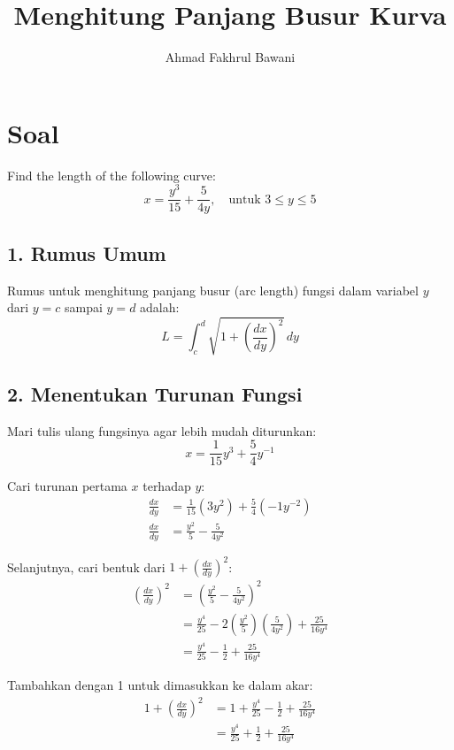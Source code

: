 \documentclass[12pt,a4paper]{article}
\title{Menghitung Panjang Busur Kurva}
\author{Ahmad Fakhrul Bawani}
\date{}
\begin{document}
\maketitle

\section*{Soal}

Find the length of the following curve:
\begin{equation*}
  x = \frac{y^3}{15} + \frac{5}{4y}, \quad \text{untuk } 3 \le y \le 5
\end{equation*}

\subsection*{1. Rumus Umum}
Rumus untuk menghitung panjang busur (arc length) fungsi dalam variabel $y$ dari $y = c$ sampai $y = d$ adalah:
\begin{equation*}
  L = \int_{c}^{d} \sqrt{1 + \left(\frac{dx}{dy}\right)^2} \, dy
\end{equation*}

\subsection*{2. Menentukan Turunan Fungsi}
Mari tulis ulang fungsinya agar lebih mudah diturunkan:
\begin{equation*}
  x = \frac{1}{15}y^3 + \frac{5}{4}y^{-1}
\end{equation*}

Cari turunan pertama $x$ terhadap $y$:
\begin{align*}
  \frac{dx}{dy} &= \frac{1}{15}(3y^2) + \frac{5}{4}(-1y^{-2}) \\
  \frac{dx}{dy} &= \frac{y^2}{5} - \frac{5}{4y^2}
\end{align*}

Selanjutnya, cari bentuk dari $1 + \left(\frac{dx}{dy}\right)^2$:
\begin{align*}
  \left(\frac{dx}{dy}\right)^2 &= \left(\frac{y^2}{5} - \frac{5}{4y^2}\right)^2 \\
  &= \frac{y^4}{25} - 2\left(\frac{y^2}{5}\right)\left(\frac{5}{4y^2}\right) + \frac{25}{16y^4} \\
  &= \frac{y^4}{25} - \frac{1}{2} + \frac{25}{16y^4}
\end{align*}

Tambahkan dengan 1 untuk dimasukkan ke dalam akar:
\begin{align*}
  1 + \left(\frac{dx}{dy}\right)^2 &= 1 + \frac{y^4}{25} - \frac{1}{2} + \frac{25}{16y^4} \\
  &= \frac{y^4}{25} + \frac{1}{2} + \frac{25}{16y^4}
\end{align*}
\end{document}
